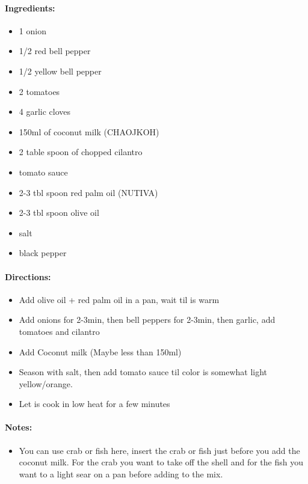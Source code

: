 \documentclass{article}
\begin{document}
\paragraph{Ingredients:}
\begin{itemize}
    \item 1 onion
    \item 1/2 red bell pepper
    \item 1/2 yellow bell pepper
    \item 2 tomatoes
    \item 4 garlic cloves
    \item 150ml of coconut milk (CHAOJKOH)
    \item 2 table spoon of chopped cilantro
    \item tomato sauce
    \item 2-3 tbl spoon red palm oil (NUTIVA)
    \item 2-3 tbl spoon olive oil
    \item salt
    \item black pepper
\end{itemize}

\paragraph{Directions:}
\begin{itemize}
    \item Add olive oil + red palm oil in a pan, wait til is warm
    \item Add onions for 2-3min, then bell peppers for 2-3min, then garlic, add tomatoes and cilantro
    \item Add Coconut milk (Maybe less than 150ml)
    \item Season with salt, then add tomato sauce til color is somewhat light yellow/orange.
    \item Let is cook in low heat for a few minutes
\end{itemize}

\paragraph{Notes:}
\begin{itemize}
    \item You can use crab or fish here, insert the crab or fish just before you add the coconut milk. For the crab you want to take off the shell and for the fish you want to a light sear on a pan before adding to the mix.
\end{itemize}
\end{document}
